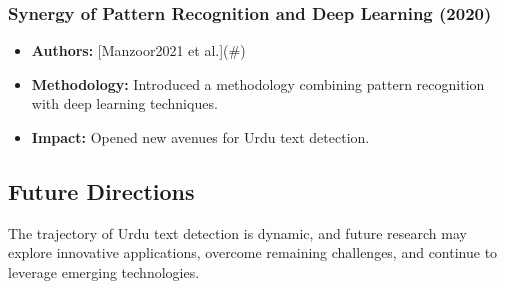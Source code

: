 \documentclass[default,iicol]{sn-jnl}%
\begin{document}
	\subsubsection{Synergy of Pattern Recognition and Deep Learning (2020)}
	
	\begin{itemize}
		\item \textbf{Authors:} [Manzoor2021 et al.](\#)
		\item \textbf{Methodology:} Introduced a methodology combining pattern recognition with deep learning techniques.
		\item \textbf{Impact:} Opened new avenues for Urdu text detection.
	\end{itemize}
	
	\subsection{Future Directions}
	
	The trajectory of Urdu text detection is dynamic, and future research may explore innovative applications, overcome remaining challenges, and continue to leverage emerging technologies.
	





\end{document}
